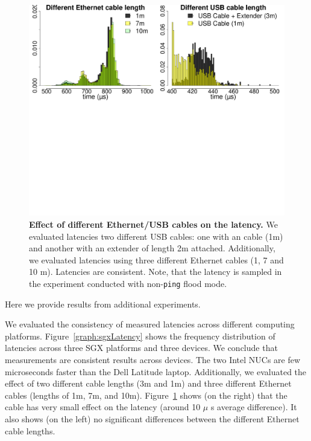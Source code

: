 \begin{figure}[t]
  \centering
    \includegraphics[trim={0 18cm 0 0}, clip, width=\linewidth]{chapters/ProximiTEE/data/graph/CombinedCable_1.pdf}
    \caption[Effect of Different Ethernet/USB cables on the latency]{\textbf{Effect of different Ethernet/USB cables on the latency.} We evaluated latencies two different USB cables: one with an \usb cable (1m) and another with an \usb extender of length 2m attached. Additionally, we evaluated latencies using three different Ethernet cables (1, 7 and 10 m). Latencies are consistent. Note, that the latency is sampled in the experiment conducted with non-\texttt{ping} flood mode.}
    \label{graph:usbCableLength}
\end{figure}


Here we provide results from additional experiments.

We evaluated the consistency of measured latencies across different computing platforms. Figure~\ref{graph:sgxLatency} shows the frequency distribution of latencies across three SGX platforms and three \device devices. We conclude that measurements are consistent results across devices. The two Intel NUCs are few microseconds faster than the Dell Latitude laptop. Additionally, we evaluated the effect of two different \usb cable lengths (3m and 1m) and three different Ethernet cables (lengths of 1m, 7m, and 10m). Figure~\ref{graph:usbCableLength} shows (on the right) that the \usb cable has very small effect on the latency (around 10 $\mu$ s average difference). It also shows (on the left) no significant differences between the different Ethernet cable lengths. 


